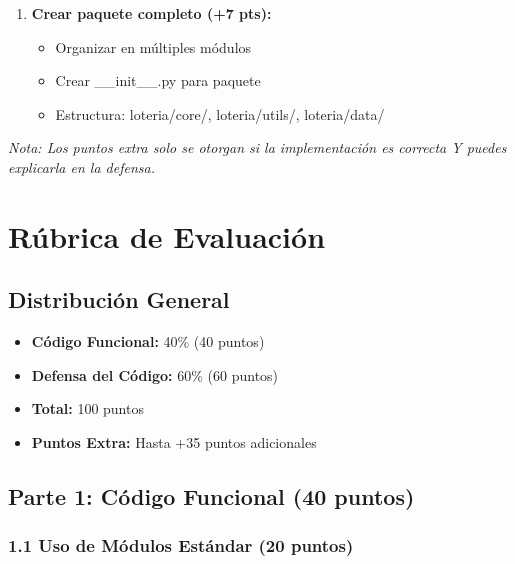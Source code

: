 \documentclass[12pt,a4paper]{article}
\begin{document}
\begin{enumerate}[leftmargin=*]
    \item \textbf{Crear paquete completo (+7 pts):}
    \begin{itemize}
        \item Organizar en múltiples módulos
        \item Crear \_\_init\_\_.py para paquete
        \item Estructura: loteria/core/, loteria/utils/, loteria/data/
    \end{itemize}
\end{enumerate}

\textit{Nota: Los puntos extra solo se otorgan si la implementación es correcta Y puedes explicarla en la defensa.}

\newpage

\section{Rúbrica de Evaluación}

\subsection{Distribución General}

\begin{itemize}
    \item \textbf{Código Funcional:} 40\% (40 puntos)
    \item \textbf{Defensa del Código:} 60\% (60 puntos)
    \item \textbf{Total:} 100 puntos
    \item \textbf{Puntos Extra:} Hasta +35 puntos adicionales
\end{itemize}

\subsection{Parte 1: Código Funcional (40 puntos)}

\subsubsection{1.1 Uso de Módulos Estándar (20 puntos)}
\end{document}
